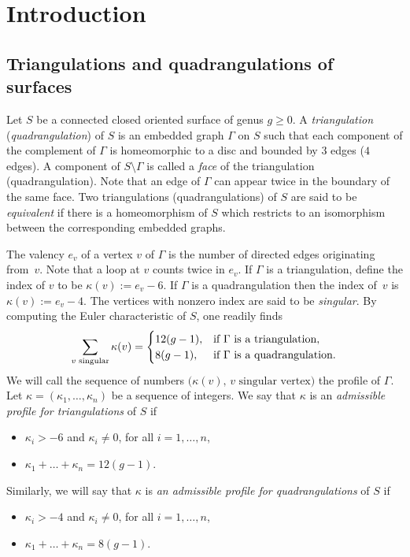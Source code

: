 \documentclass[JEP,XML,SOM,Unicode]{cedram}
\theoremstyle{plain}
\theoremstyle{definition}
\let\G\Gamma
\begin{document}
\section{Introduction}\label{sec:intro}
\subsection{Triangulations and quadrangulations of surfaces}\label{sec:triang:quad}
Let $S$ be a connected closed oriented surface of genus $g \geq 0$. A \emph{triangulation} (\resp \emph{quadrangulation}) of $S$ is an embedded graph $\G$ on $S$ such that each component of the complement of $\G$ is homeomorphic to a disc and bounded by $3$ edges (\resp $4$ edges). A component of $S\setminus \G$ is called a \emph{face} of the triangulation (\resp quadrangulation). Note that an edge of $\G$ can appear twice in the boundary of the same face. Two triangulations (\resp quadrangulations) of $S$ are said to be \emph{equivalent} if there is a homeomorphism of $S$ which restricts to an isomorphism between the corresponding embedded graphs.

The valency $e_v$ of a vertex $v$ of $\G$ is the number of directed edges originating from~$v$. Note that a loop at $v$ counts twice in $e_v$. If $\G$ is a triangulation, define the index of $v$ to be $\kappa(v):=e_v-6$. If $\G$ is a quadrangulation then the index of~$v$ is $\kappa(v):=e_v-4$. The vertices with nonzero index are said to be \emph{singular}. By computing the Euler characteristic of $S$, one readily finds
\begin{equation}\label{eq:euler:char}
\sum_{v\text{ singular}}\kappa(v)=
\begin{cases}
12(g-1), & \hbox{if $\G$ is a triangulation}, \\
8(g-1), & \hbox{if $\G$ is a quadrangulation}.
\end{cases}
\end{equation}
We will call the sequence of numbers $\bigl(\kappa(v), \, v \textrm{ singular vertex}\bigr)$ the profile of $\G$.
Let $\kappa=(\kappa_1,\dots,\kappa_n)$ be a sequence of integers.
We say that $\kappa$ is an \emph{admissible profile for triangulations} of $S$ if
\begin{itemize}\renewcommand{\labelitemi}{$\scriptstyle\bullet$}
\item
$\kappa_i>-6$ and $\kappa_i\neq 0$, for all $i=1,\dots,n$,
\item
$\kappa_1+\dots+\kappa_n=12(g-1)$.
\end{itemize}
Similarly, we will say that $\kappa$ is \emph{an admissible profile for quadrangulations} of $S$ if
\begin{itemize}\renewcommand{\labelitemi}{$\scriptstyle\bullet$}
\item
$\kappa_i>-4$ and $\kappa_i\neq 0$, for all $i=1,\dots,n$,
\item
$\kappa_1+\dots+\kappa_n=8(g-1)$.
\end{itemize}
\end{document}
